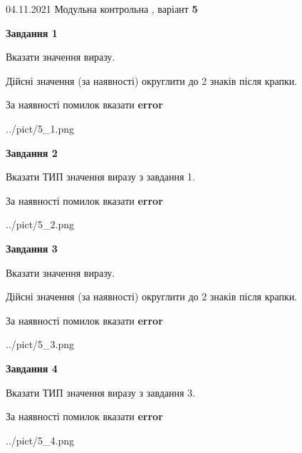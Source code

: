 \documentclass[11pt, ukrainian]{article}
\begin{document}
{04.11.2021 Модульна контрольна , варіант  \No \textbf { 5 }\par}
{
\begin {large}
{\begin {center}\textbf{Завдання 1}\end {center}}\par
Вказати значення виразу. \par
Дійсні значення (за наявності) округлити до 2 знаків після крапки. \par
За наявності помилок вказати \textbf{error}

\begin{center}
	{../pict/5_1.png}
\end{center}
\newpage

{\begin {center}\textbf{Завдання 2}\end {center}}\par
Вказати ТИП значення виразу з завдання 1. \par
За наявності помилок вказати \textbf{error}

\begin{center}
	{../pict/5_2.png}
\end{center}
\newpage

{\begin {center}\textbf{Завдання 3}\end {center}}\par
Вказати значення виразу. \par
Дійсні значення (за наявності) округлити до 2 знаків після крапки. \par
За наявності помилок вказати \textbf{error}

\begin{center}
	{../pict/5_3.png}
\end{center}
\newpage

{\begin {center}\textbf{Завдання 4}\end {center}}\par
Вказати ТИП значення виразу з завдання 3. \par
За наявності помилок вказати \textbf{error}

\begin{center}
	{../pict/5_4.png}
\end{center}
\newpage


\end{large}}
\end{document}
